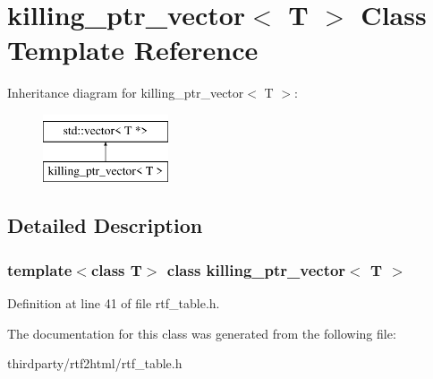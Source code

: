\hypertarget{classkilling__ptr__vector}{}\section{killing\+\_\+ptr\+\_\+vector$<$ T $>$ Class Template Reference}
\label{classkilling__ptr__vector}
Inheritance diagram for killing\+\_\+ptr\+\_\+vector$<$ T $>$\+:\begin{figure}[H]
\begin{center}
\leavevmode
\includegraphics[height=2.000000cm]{classkilling__ptr__vector}
\end{center}
\end{figure}


\subsection{Detailed Description}
\subsubsection*{template$<$class T$>$\newline
class killing\+\_\+ptr\+\_\+vector$<$ T $>$}



Definition at line 41 of file rtf\+\_\+table.\+h.



The documentation for this class was generated from the following file\+:\begin{DoxyCompactItemize}
\item 
thirdparty/rtf2html/rtf\+\_\+table.\+h\end{DoxyCompactItemize}
